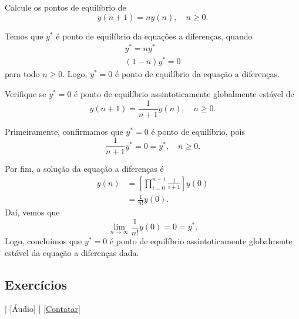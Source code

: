 \begin{exeresol}
  Calcule os pontos de equilíbrio de
  \begin{equation}
    y(n+1) = ny(n),\quad n\geq 0.
  \end{equation}
\end{exeresol}
\begin{resol}
  Temos que $y^*$ é ponto de equilíbrio da equações a diferenças, quando
  \begin{gather}
    y^* = ny^*\\
    (1-n)y^* = 0
  \end{gather}
  para todo $n\geq 0$. Logo, $y^*=0$ é ponto de equilíbrio da equação a diferenças.
\end{resol}

\begin{exeresol}
  Verifique se $y^*=0$ é ponto de equilíbrio assintoticamente globalmente estável de
  \begin{equation}
    y(n+1) = \frac{1}{n+1}y(n),\quad n\geq 0.
  \end{equation}
\end{exeresol}
\begin{resol}
  Primeiramente, confirmamos que $y^* = 0$ é ponto de equilíbrio, pois
  \begin{equation}
    \frac{1}{n+1}y^* = 0 = y^*,\quad n\geq 0.
  \end{equation}

  Por fim, a solução da equação a diferenças é
  \begin{align}
    y(n) &= \left[\prod_{i=0}^{n-1}\frac{1}{i+1}\right]y(0)\\
    &= \frac{1}{n!}y(0).
  \end{align}
  Daí, vemos que
  \begin{equation}
    \lim_{n\to\infty} \frac{1}{n!}y(0) = 0 = y^*.
  \end{equation}
  Logo, concluímos que $y^*=0$ é ponto de equilíbrio assintoticamente globalmente estável da equação a diferenças dada. 
\end{resol}

\subsection*{Exercícios}

\begin{flushright}
  [Vídeo] | [Áudio] | \href{https://phkonzen.github.io/notas/contato.html}{[Contatar]}
\end{flushright}

